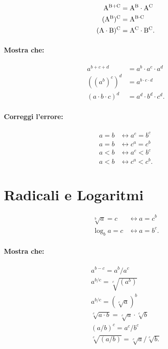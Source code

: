 \documentclass{article}
\begin{document}
\begin{align*}
{\rm A}^{{\rm B} + {\rm C}} &= {\rm A}^{\rm B} \cdot {\rm A}^{\rm C}\\
({\rm A}^{\rm B})^{\rm C} &= {\rm A}^{{\rm B} \cdot {\rm C}}\\
({\rm A} \cdot {\rm B})^{\rm C} &= {\rm A}^{\rm C} \cdot {\rm B}^{\rm C}.
\end{align*}

\paragraph{Mostra che:}

\begin{align*}
a^{b + c + d} &= a^b \cdot a^c \cdot a^d\\
((a^b)^c)^d &= a^{b \cdot c \cdot d}\\
(a \cdot b \cdot c)^d &= a^d \cdot b^d \cdot c^d.
\end{align*}

\paragraph{Correggi l'errore:}

\begin{align*}
a = b &\longleftrightarrow a^c = b^c\\
a = b &\longleftrightarrow c^a = c^b\\
a < b &\longleftrightarrow a^c < b^c\\
a < b &\longleftrightarrow c^a < c^b.
\end{align*}

\newpage
\section*{Radicali e Logaritmi}

\begin{align*}
\sqrt[b]{a} = c &\longleftrightarrow a = c^b\\
\log_b{a} = c &\longleftrightarrow a = b^c.
\end{align*}

\paragraph{Mostra che:}

\begin{align*}
a^{b - c} = a^b / a^c\\
a^{b / c} = \sqrt[c]{(a^b)}\\
a^{b / c} = (\sqrt[c]{a})^b\\
\sqrt[c]{a \cdot b} = \sqrt[c]{a} \cdot \sqrt[c]{b}\\
(a / b)^c = a^c / b^c\\
\sqrt[c]{(a / b)} = \sqrt[c]{a} / \sqrt[c]{b.}
\end{align*}
\end{document}
